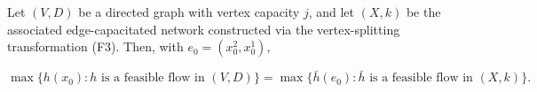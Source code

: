 Let $(V, D)$ be a directed graph with vertex capacity $j$, and let $(X, k)$ be the associated edge-capacitated network constructed via the vertex-splitting transformation (F3). Then, with $e_0 = (x_0^2, x_0^1)$,

$$\max\{h(x_0): h \text{ is a feasible flow in } (V, D)\} = \max\{\bar{h}(e_0): \bar{h} \text{ is a feasible flow in } (X, k)\}.$$
